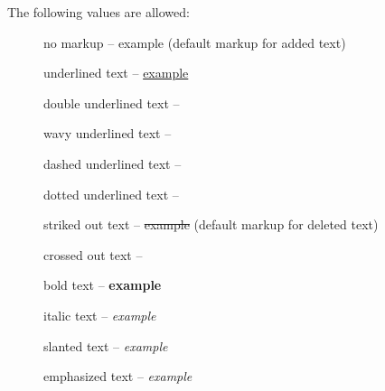 The following values are allowed:
\begin{description}
	\item [] no markup -- example (default markup for added text)
	\item [] underlined text -- \uline{example}
	\item [] double underlined text -- 
	\item [] wavy underlined text -- 
	\item [] dashed underlined text -- 
	\item [] dotted underlined text -- 
	\item [] striked out text -- \sout{example} (default markup for deleted text)
	\item [] crossed out text -- 
	\item [] bold text -- \textbf{example}
	\item [] italic text -- \textit{example}
	\item [] slanted text -- \textsl{example}
	\item [] emphasized text -- \emph{example}
\end{description}

\begin{chusage}
		\>\\
	\usageexample
		\> \Corresponds\ \\
		\>\\
\end{chusage}

\begin{chusage}
		\>\\
	\usageexample
		\> \Corresponds\ \\
		\>\\
		\>
\end{chusage}



